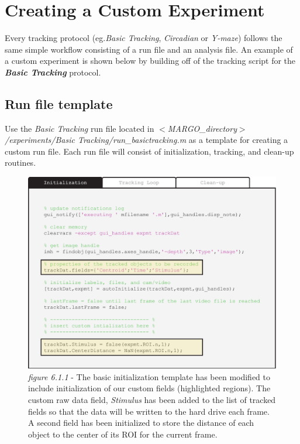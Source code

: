 \documentclass[11pt]{article}
\begin{document}
\newpage
\section{Creating a Custom Experiment}

Every tracking protocol (eg.\textit{Basic Tracking}, \textit{Circadian} or \textit{Y-maze}) follows the same simple workflow consisting of a run file and an analysis file. An example of a custom experiment is shown below by building off of the tracking script for the \textit{\textbf{Basic Tracking}} protocol. 

\subsection{Run file template}
Use the \textit{Basic Tracking} run file located in \textit{$<$MARGO\_directory$>$/experiments/Basic Tracking/run\_basictracking.m} as a template for creating a custom run file. Each run file will consist of initialization, tracking, and clean-up routines.

\begin{figure}[h!]
	\begin{center}
		\vspace*{0.75cm}
		\includegraphics[width=1\textwidth]{images/custom_exp/initialization.pdf}
		\caption*{\footnotesize {\textit{figure 6.1.1} - The basic initialization template has been modified to include initialization of our custom fields (highlighted regions). The custom raw data field, \textit{Stimulus} has been added to the list of tracked fields so that the data will be written to the hard drive each frame. A second field has been initialized to store the distance of each object to the center of its ROI for the current frame.}}
	\end{center}
\end{figure}
\end{document}
